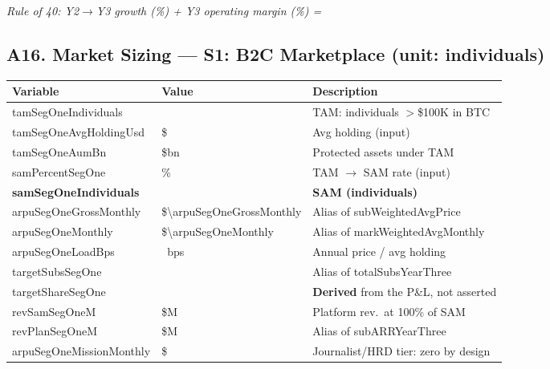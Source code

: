 \medskip
\textit{Rule of 40: Y2$\rightarrow$Y3 growth (\%) + Y3 operating margin (\%) = }

\subsection*{A16. Market Sizing --- S1: B2C Marketplace (unit: individuals)}
\begin{tabularx}{\linewidth}{l Y X}
\toprule
\textbf{Variable} & \textbf{Value} & \textbf{Description} \\\midrule
tamSegOneIndividuals & \validateint{\tamSegOneIndividuals}{\HCtamSegOneIndividuals} & TAM: individuals $>$\$100K in BTC \\
tamSegOneAvgHoldingUsd & \$\numint{\tamSegOneAvgHoldingUsd} & Avg holding (input) \\
tamSegOneAumBn & \$\validateint{\tamSegOneAumBn}{\HCtamSegOneAumBn}bn & Protected assets under TAM \\
samPercentSegOne & \numint{\samPercentSegOne}\% & TAM $\rightarrow$ SAM rate (input) \\
\textbf{samSegOneIndividuals} & \textbf{\validateint{\samSegOneIndividuals}{\HCsamSegOneIndividuals}} & \textbf{SAM (individuals)} \\
arpuSegOneGrossMonthly & \$\num{\arpuSegOneGrossMonthly} & Alias of subWeightedAvgPrice \\
arpuSegOneMonthly & \$\num{\arpuSegOneMonthly} & Alias of markWeightedAvgMonthly \\
arpuSegOneLoadBps & \validateint{\arpuSegOneLoadBps}{\HCarpuSegOneLoadBps}~bps & Annual price / avg holding \\
targetSubsSegOne & \numint{\targetSubsSegOne} & Alias of totalSubsYearThree \\
targetShareSegOne & \validatepct{\targetShareSegOne}{\HCtargetShareSegOne} & \textbf{Derived} from the P\&L, not asserted \\
revSamSegOneM & \$\validate{\revSamSegOneM}{\HCrevSamSegOneM}M & Platform rev.\ at 100\% of SAM \\
revPlanSegOneM & \$\validate{\revPlanSegOneM}{\HCrevPlanSegOneM}M & Alias of subARRYearThree \\
arpuSegOneMissionMonthly & \$\numint{\arpuSegOneMissionMonthly} & Journalist/HRD tier: zero by design \\
\bottomrule
\end{tabularx}

